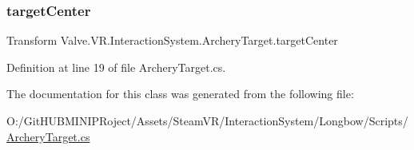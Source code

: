 \subsubsection{\texorpdfstring{targetCenter}{targetCenter}}
{\footnotesize\ttfamily Transform Valve.\+V\+R.\+Interaction\+System.\+Archery\+Target.\+target\+Center}



Definition at line 19 of file Archery\+Target.\+cs.



The documentation for this class was generated from the following file\+:\begin{DoxyCompactItemize}
\item 
O\+:/\+Git\+H\+U\+B\+M\+I\+N\+I\+P\+Roject/\+Assets/\+Steam\+V\+R/\+Interaction\+System/\+Longbow/\+Scripts/\mbox{\hyperlink{_archery_target_8cs}{Archery\+Target.\+cs}}\end{DoxyCompactItemize}
